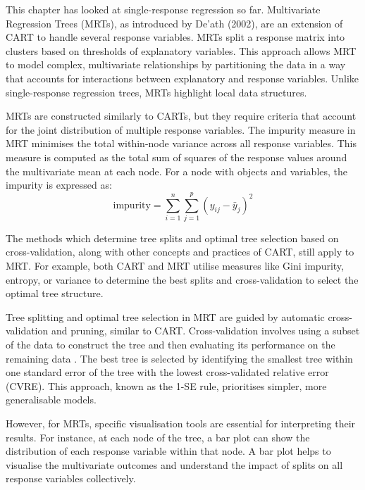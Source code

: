 This chapter has looked at single-response regression so far. Multivariate Regression Trees (MRTs), as introduced by De'ath (2002), are an extension of CART to handle several response variables.\cite{questier2005cart} MRTs split a response matrix into clusters based on thresholds of explanatory variables. This approach allows MRT to model complex, multivariate relationships by partitioning the data in a way that accounts for interactions between explanatory and response variables. Unlike single-response regression trees, MRTs highlight local data structures.\cite{qcbs_workshop}

\noindent MRTs are constructed similarly to CARTs, but they require criteria that account for the joint distribution of multiple response variables. The impurity measure in MRT minimises the total within-node variance across all response variables. This measure is computed as the total sum of squares of the response values around the multivariate mean at each node.\cite{questier2005cart} For a node with  objects and  variables, the impurity is expressed as:
\[
\text{impurity} = \sum_{i=1}^{n} \sum_{j=1}^{p} \left( y_{ij} - \bar{y}_j \right)^2
\]

\noindent The methods which determine tree splits and optimal tree selection based on cross-validation, along with other concepts and practices of CART, still apply to MRT. For example, both CART and MRT utilise measures like Gini impurity, entropy, or variance to determine the best splits and cross-validation to select the optimal tree structure.\cite{questier2005cart} 

Tree splitting and optimal tree selection in MRT are guided by automatic cross-validation and pruning, similar to CART. Cross-validation involves using a subset of the data to construct the tree and then evaluating its performance on the remaining data \cite{qcbs_workshop}. The best tree is selected by identifying the smallest tree within one standard error of the tree with the lowest cross-validated relative error (CVRE).\cite{qcbs_workshop} This approach, known as the 1-SE rule, prioritises simpler, more generalisable models. 

However, for MRTs, specific visualisation tools are essential for interpreting their results. For instance, at each node of the tree, a bar plot can show the distribution of each response variable within that node. A bar plot helps to visualise the multivariate outcomes and understand the impact of splits on all response variables collectively.\cite{questier2005cart} 

